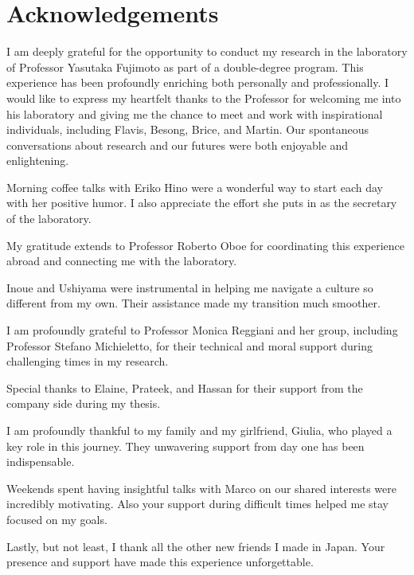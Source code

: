 \thispagestyle{empty}
\section*{Acknowledgements}
\vspace{0.5cm}
I am deeply grateful for the opportunity to conduct my research in the laboratory 
of Professor Yasutaka Fujimoto as part of a double-degree program. This experience 
has been profoundly enriching both personally and professionally. I would like 
to express my heartfelt thanks to the Professor for welcoming me into his laboratory and 
giving me the chance to meet and work with inspirational individuals, including 
Flavis, Besong, Brice, and Martin. Our spontaneous conversations about research 
and our futures were both enjoyable and enlightening.

Morning coffee talks with Eriko Hino were a wonderful way to start each day with 
her positive humor. I also appreciate the effort she puts in as the secretary of 
the laboratory.

My gratitude extends to Professor Roberto Oboe for coordinating this experience 
abroad and connecting me with the laboratory.

Inoue and Ushiyama were instrumental in helping me navigate a culture so different 
from my own. Their assistance made my transition much smoother.

I am profoundly grateful to Professor Monica Reggiani and her group, including 
Professor Stefano Michieletto, for their technical and moral support during 
challenging times in my research.

Special thanks to Elaine, Prateek, and Hassan for their support from the company 
side during my thesis.

I am profoundly thankful to my family and my girlfriend, Giulia, who played a 
key role in this journey. They unwavering support from day one has been indispensable.

Weekends spent having insightful talks with Marco on our shared interests were 
incredibly motivating. Also your support during difficult times helped me stay 
focused on my goals.

Lastly, but not least, I thank all the other new friends I made in Japan. Your 
presence and support have made this experience unforgettable.
\afterpage{\blankpage}